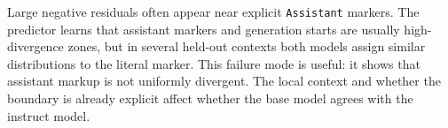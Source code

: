 Large negative residuals often appear near explicit \texttt{Assistant} markers. The predictor learns that assistant markers and generation starts are usually high-divergence zones, but in several held-out contexts both models assign similar distributions to the literal marker. This failure mode is useful: it shows that assistant markup is not uniformly divergent. The local context and whether the boundary is already explicit affect whether the base model agrees with the instruct model.
